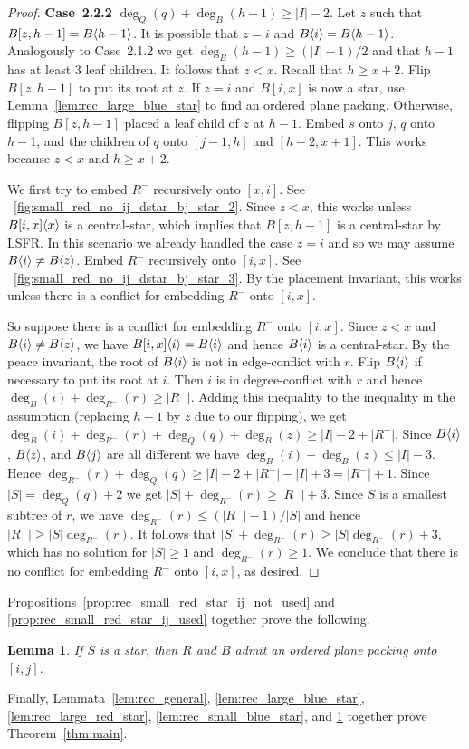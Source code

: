 \documentclass[11pt,a4paper,colorlinks=true,urlcolor=blue,citecolor=red]{article}
\theoremstyle{plain}
\newtheorem{lemma}[theorem]{Lemma}
\newcommand{\case}[1]{\par\vspace{.5\baselineskip}\noindent\textbf{\sffamily Case~#1}}
\begin{document}
\begin{proof}
  \case{2.2.2} $\deg_Q(q)+\deg_B(h-1)\geq|I|-2$. Let $z$ such that
  $B[z,h-1]=B\langle{h-1}\rangle$. It is possible that $z=i$ and
  $B\langle{i}\rangle=B\langle{h-1}\rangle$. Analogously to Case~2.1.2 we get
  $\deg_B(h-1)\geq(|I|+1)/2$ and that $h-1$ has at least $3$ leaf
  children. It follows that $z<x$. Recall that $h\geq x+2$. Flip
  $B[z,h-1]$ to put its root at $z$. If $z=i$ and $B[i,x]$ is now a
  star, use Lemma~\ref{lem:rec_large_blue_star} to find an ordered plane
  packing. Otherwise, flipping $B[z,h-1]$ placed a leaf child of $z$ at
  $h-1$. Embed $s$ onto $j$, $q$ onto $h-1$, and the children of $q$
  onto $[j-1,h]$ and $[h-2,x+1]$. This works because $z<x$ and $h\geq
  x+2$.

  We first try to embed $R^-$ recursively onto $[x,i]$. See
  \figurename~\ref{fig:small_red_no_ij_dstar_bj_star_2}. Since $z<x$,
  this works unless $B{[i,x]}\langle{x}\rangle$ is a central-star, which
  implies that $B[z,h-1]$ is a central-star by LSFR. In this scenario we
  already handled the case $z=i$ and so we may assume
  $B\langle{i}\rangle\neq B\langle{z}\rangle$. Embed $R^-$ recursively onto $[i,x]$. See
  \figurename~\ref{fig:small_red_no_ij_dstar_bj_star_3}. By the
  placement invariant, this works unless there is a conflict for
  embedding $R^-$ onto $[i,x]$.

  So suppose there is a conflict for embedding $R^-$ onto $[i,x]$.
  Since $z<x$ and $B\langle{i}\rangle\neq B\langle{z}\rangle$, we have
  $B{[i,x]}\langle{i}\rangle=B\langle{i}\rangle$ and hence $B\langle{i}\rangle$ is a
  central-star. By the peace invariant, the root of $B\langle{i}\rangle$ is not
  in edge-conflict with $r$. Flip $B\langle{i}\rangle$ if necessary to put its
  root at $i$. Then $i$ is in degree-conflict with $r$ and hence
  $\deg_B(i)+\deg_{R^-}(r)\geq|R^-|$. Adding this inequality to the
  inequality in the assumption (replacing $h-1$ by $z$ due to our
  flipping), we get
  $\deg_B(i)+\deg_{R^-}(r)+\deg_Q(q)+\deg_B(z)\geq|I|-2+|R^-|$. Since
  $B\langle{i}\rangle$, $B\langle{z}\rangle$, and $B\langle{j}\rangle$ are all different we have
  $\deg_B(i)+\deg_B(z)\leq|I|-3$. Hence
  $\deg_{R^-}(r)+\deg_Q(q)\geq|I|-2+|R^-|-|I|+3=|R^-|+1$. Since
  $|S|=\deg_Q(q)+2$ we get $|S|+\deg_{R^-}(r)\geq|R^-|+3$. Since $S$ is
  a smallest subtree of $r$, we have $\deg_{R^-}(r)\leq (|R^-|-1)/|S|$
  and hence $|R^-|\geq|S|\deg_{R^-}(r)$. It follows that
  $|S|+\deg_{R^-}(r)\geq|S|\deg_{R^-}(r)+3$, which has no solution for
  $|S|\geq1$ and $\deg_{R^-}(r)\geq1$. We conclude that there is no
  conflict for embedding $R^-$ onto $[i,x]$, as desired.
\end{proof}

\noindent
Propositions~\ref{prop:rec_small_red_star_ij_not_used} and
\ref{prop:rec_small_red_star_ij_used} together prove the following.
\begin{lemma}
  \label{lem:rec_small_red_star}
  If $S$ is a star, then $R$ and $B$ admit an ordered plane packing
  onto $[i,j]$.
\end{lemma}

\noindent
Finally, Lemmata~\ref{lem:rec_general}, \ref{lem:rec_large_blue_star},
\ref{lem:rec_large_red_star}, \ref{lem:rec_small_blue_star}, and
\ref{lem:rec_small_red_star} together prove
Theorem~\ref{thm:main}. \label{proofend}


\end{document}
